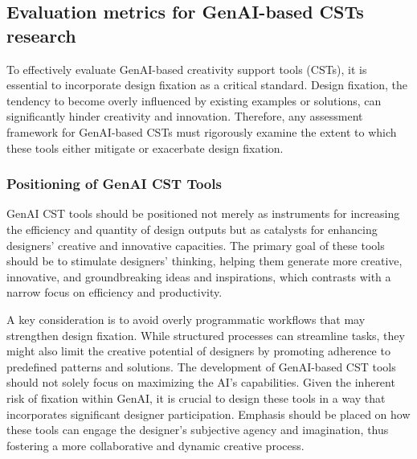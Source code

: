 

\subsection{Evaluation metrics for GenAI-based CSTs research}

To effectively evaluate GenAI-based creativity support tools (CSTs), it is essential to incorporate design fixation as a critical standard. Design fixation, the tendency to become overly influenced by existing examples or solutions, can significantly hinder creativity and innovation. Therefore, any assessment framework for GenAI-based CSTs must rigorously examine the extent to which these tools either mitigate or exacerbate design fixation.


\subsubsection{Positioning of GenAI CST Tools}

GenAI CST tools should be positioned not merely as instruments for increasing the efficiency and quantity of design outputs but as catalysts for enhancing designers' creative and innovative capacities. The primary goal of these tools should be to stimulate designers' thinking, helping them generate more creative, innovative, and groundbreaking ideas and inspirations, which contrasts with a narrow focus on efficiency and productivity.

A key consideration is to avoid overly programmatic workflows that may strengthen design fixation. While structured processes can streamline tasks, they might also limit the creative potential of designers by promoting adherence to predefined patterns and solutions. The development of GenAI-based CST tools should not solely focus on maximizing the AI's capabilities. Given the inherent risk of fixation within GenAI, it is crucial to design these tools in a way that incorporates significant designer participation. Emphasis should be placed on how these tools can engage the designer's subjective agency and imagination, thus fostering a more collaborative and dynamic creative process.

